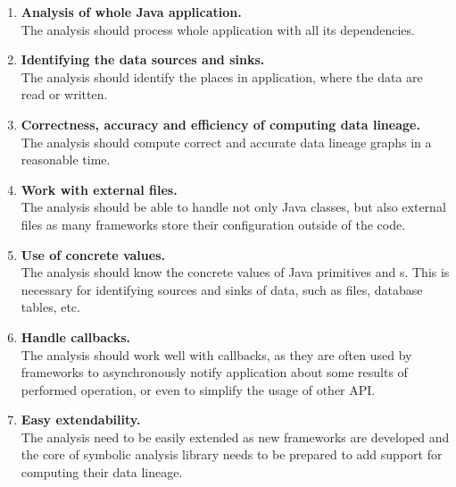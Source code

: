 \begin{enumerate}
  \item \textbf{Analysis of whole Java application.} \\
    The analysis should process whole application with all its dependencies.
  \item \textbf{Identifying the data sources and sinks.} \\
    The analysis should identify the places in application, where the data
    are read or written.
  \item \textbf{Correctness, accuracy and efficiency of computing data lineage.} \\
    The analysis should compute correct and accurate data lineage graphs in a reasonable time.
  \item \textbf{Work with external files.} \\
    The analysis should be able to handle not only Java classes,
    but also external files as many frameworks store their configuration
    outside of the code.
  \item \textbf{Use of concrete values.} \\
    The analysis should know the concrete values of Java primitives and\break
    s.
    This is necessary for identifying sources and sinks of data,
    such as files, database tables, etc.
  \item \textbf{Handle callbacks.} \\
    The analysis should work well with callbacks, as they are often
    used by frameworks to asynchronously notify application
    about some results of performed operation, or even
    to simplify the usage of other API.
  \item \textbf{Easy extendability.} \\
    The analysis need to be easily extended as new frameworks are developed
    and the core of symbolic analysis library needs to be prepared to add support for computing their data lineage.
\end{enumerate}



